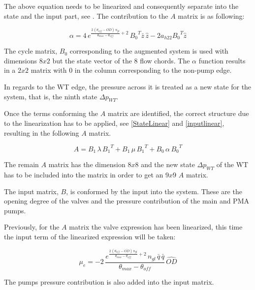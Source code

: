 The above equation needs to be linearized and consequently separate into the state and the input part, see . The contribution to the $A$ matrix is as 
following:

\begin{equation}
  \alpha = 4 \, e^{\frac{2 \, (\theta_{off} - \bar{OD}) \, n_{gl}}{\theta_{max}-\theta_{off}}+2} \, {B_0}^{T} \bar{z} \, \hat{z} - 2 a_{h22} {B_0}^{T} \hat{z}
\end{equation}

The cycle matrix, $B_0$ corresponding to the augmented system is used with dimensions $8x2$ but the state vector of the 8 flow chords.
 The $\alpha$ function results in a $2x2$ matrix with $0$ in the column corresponding to the non-pump edge. 

In regards to the WT edge, the pressure across it is treated as a new state for the system, that is, the ninth state $\Delta p_{WT}$. 

Once the terms conforming the $A$ matrix are identified, the correct structure due to the linearization has to be applied, see \eqref{StateLinear} and \eqref{inputlinear}, resulting in
the following $A$ matrix.

\begin{equation}
  A = B_1 \, \lambda \, {B_1}^T + B_1 \, \mu \, {B_1}^T + B_0 \, \alpha \, {B_0}^T
\end{equation}

The remain $A$ matrix has the dimension $8x8$ and the new state $\Delta p_{WT}$ of the WT has to be included into the matrix in order to get an $9x9$ $A$ 
matrix. 

The input matrix, $B$, is conformed by the input into the system. These are the opening degree of the valves and the pressure contribution of the main 
and PMA pumps. 

Previously, for the $A$ matrix the valve expression has been linearized, this time the input term of the linearized expression will be taken:

\begin{equation}
  {\mu}_e = -2 \, \frac{e^{\frac{2 \, (\theta_{off} - \bar{OD}) \, n_{gl}}{\theta_{max}-\theta_{off}}+2}
   \, n_{gl} \,  \bar{q} \, \bar{q}}{\theta_{max}-\theta_{off}} \, \hat{OD}
\end{equation}

The pumps pressure contribution is also added into the input matrix. 


